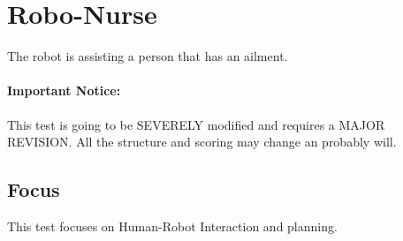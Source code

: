 \newpage
\section{Robo-Nurse}

The robot is assisting a person that has an ailment.

{\color{red} \paragraph{Important Notice:} This test is going to be SEVERELY modified and requires a MAJOR REVISION. All the structure and scoring may change an probably will.}

\subsection{Focus}

This test focuses on Human-Robot Interaction and planning.

